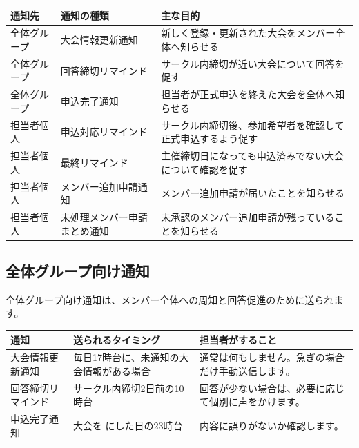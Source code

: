 \documentclass[a4paper,11pt]{ltjsarticle}
\newcommand{\code}[1]{\tcbox[
  on line,
  boxsep=0.3mm,
  left=0.7mm,
  right=0.7mm,
  top=0.2mm,
  bottom=0.2mm,
  arc=0.7mm,
  colback=soft,
  colframe=soft
]{\ttfamily\small #1}}
\begin{document}
\renewcommand{\arraystretch}{1.25}
\begin{tabularx}{\linewidth}{>{\raggedright\arraybackslash}X>{\raggedright\arraybackslash}X>{\raggedright\arraybackslash}X}
\toprule
\rowcolor{tablehead}
\textbf{通知先} & \textbf{通知の種類} & \textbf{主な目的} \\ \midrule
全体グループ & 大会情報更新通知 & 新しく登録・更新された大会をメンバー全体へ知らせる \\
全体グループ & 回答締切リマインド & サークル内締切が近い大会について回答を促す \\
全体グループ & 申込完了通知 & 担当者が正式申込を終えた大会を全体へ知らせる \\
担当者個人 & 申込対応リマインド & サークル内締切後、参加希望者を確認して正式申込するよう促す \\
担当者個人 & 最終リマインド & 主催締切日になっても申込済みでない大会について確認を促す \\
担当者個人 & メンバー追加申請通知 & メンバー追加申請が届いたことを知らせる \\
担当者個人 & 未処理メンバー申請まとめ通知 & 未承認のメンバー追加申請が残っていることを知らせる \\
\bottomrule
\end{tabularx}

\subsection{全体グループ向け通知}

全体グループ向け通知は、メンバー全体への周知と回答促進のために送られます。

\renewcommand{\arraystretch}{1.25}
\begin{tabularx}{\linewidth}{>{\raggedright\arraybackslash}X>{\raggedright\arraybackslash}X>{\raggedright\arraybackslash}X}
\toprule
\rowcolor{tablehead}
\textbf{通知} & \textbf{送られるタイミング} & \textbf{担当者がすること} \\ \midrule
大会情報更新通知 & 毎日17時台に、未通知の大会情報がある場合 & 通常は何もしません。急ぎの場合だけ手動送信します。 \\
回答締切リマインド & サークル内締切2日前の10時台 & 回答が少ない場合は、必要に応じて個別に声をかけます。 \\
申込完了通知 & 大会を \code{申込済み} にした日の23時台 & 内容に誤りがないか確認します。 \\
\bottomrule
\end{tabularx}
\end{document}
